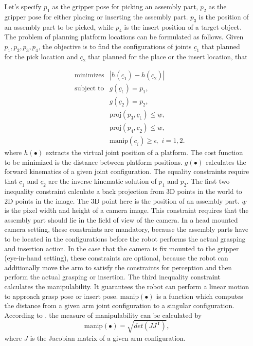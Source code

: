 Let's specify $p_1$ as the gripper pose for picking an assembly part,  $p_2$ as the gripper pose for either placing or inserting the assembly part. $p_3$ is the position of an assembly part to be picked, while $p_4$ is the insert position of a target object. The problem of planning platform locations can be formulated as follows. Given $p_1, p_2, p_3, p_4$, the objective is to find the configurations of joints $\underline{c}_1$ that planned for the pick location and $\underline{c}_2$ that planned for the place or the insert location, that 

\begin{equation}
\begin{aligned}
&\text{minimizes} &  |h(\underline{c}_1) - h(\underline{c}_2)| \\
&\text{subject to}  &g(\underline{c}_1) = p_1, \\
& & g(\underline{c}_2) = p_2, \\
& & \text{proj}(p_3, \underline{c}_1) \leqslant \underline{w}, \;  \\
& & \text{proj}(p_4, \underline{c}_2) \leqslant \underline{w}, \;  \\
& & \text{manip}(\underline{c}_i)\geqslant \epsilon, \; i 
= 1,2.
\end{aligned}
\label{eq:minimize}
\end{equation} 
where $h(\bullet)$ extracts the virtual joint position of a platform. The cost function to be minimized is the distance between platform positions. $g(\bullet)$ calculates the forward kinematics of a given joint configuration. The equality constraints require that $\underline{c}_1$ and $\underline{c}_2$ are the inverse kinematic solution of $p_1$ and $p_2$. The first two inequality constraint calculate a back projection from 3D points in the world to 2D points in the image. The 3D point here is the position of an assembly part. $\underline{w}$ is the pixel width and height of a camera image. This constraint requires that the assembly part should lie in the field of view of the camera. In a head mounted camera setting, these constraints are mandatory, because the assembly parts have to be located in the configurations before the robot performs the actual grasping and insertion action. In the case that the camera is fix mounted to the gripper (eye-in-hand setting), these constraints are optional, because the robot can additionally move the arm to satisfy the constraints for perception and then perform the actual grasping or insertion. The third inequality constraint calculates the manipulability. It guarantees the robot can perform a linear motion to approach grasp pose or insert pose. $\text{manip}(\bullet)$ is a function which computes the distance from a given arm joint configuration to a singular configuration. According to \cite{yoshikawa1985manipulability}, the measure of manipulability can be calculated by 
\begin{equation}
\text{manip}(\bullet) =  \sqrt{ det(J  J^\text{T} )},
\end{equation} 
where $J$ is the Jacobian matrix of a given arm configuration. 

